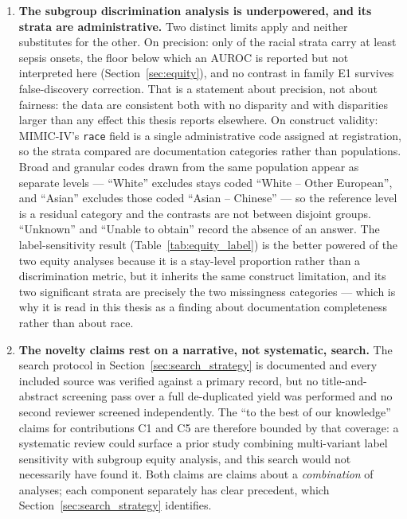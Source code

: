 \begin{enumerate}
    \item \textbf{The subgroup discrimination analysis is underpowered, and its
    strata are administrative.} Two distinct limits apply and neither
    substitutes for the other. On precision: only \pcNSubgroupsAboveFloor{} of
    the racial strata carry at least \pcMinSubgroupEvents{} sepsis onsets, the
    floor below which an AUROC is reported but not interpreted here
    (Section~\ref{sec:equity}), and no contrast in family E1 survives
    false-discovery correction. That is a statement about precision, not about
    fairness: the data are consistent both with no disparity and with
    disparities larger than any effect this thesis reports elsewhere. On
    construct validity: MIMIC-IV's \texttt{race} field is a single
    administrative code assigned at registration, so the strata compared are
    documentation categories rather than populations. Broad and granular codes
    drawn from the same population appear as separate levels --- ``White''
    excludes stays coded ``White -- Other European'', and ``Asian'' excludes
    those coded ``Asian -- Chinese'' --- so the reference level is a residual
    category and the contrasts are not between disjoint groups. ``Unknown'' and
    ``Unable to obtain'' record the absence of an answer. The
    label-sensitivity result (Table~\ref{tab:equity_label}) is the better
    powered of the two equity analyses because it is a stay-level proportion
    rather than a discrimination metric, but it inherits the same construct
    limitation, and its two significant strata are precisely the two
    missingness categories --- which is why it is read in this thesis as a
    finding about documentation completeness rather than about race.

    \item \textbf{The novelty claims rest on a narrative, not systematic,
    search.} The search protocol in Section~\ref{sec:search_strategy} is
    documented and every included source was verified against a primary record,
    but no title-and-abstract screening pass over a full de-duplicated yield was
    performed and no second reviewer screened independently. The ``to the best
    of our knowledge'' claims for contributions C1 and C5 are therefore bounded
    by that coverage: a systematic review could surface a prior study combining
    multi-variant label sensitivity with subgroup equity analysis, and this
    search would not necessarily have found it. Both claims are claims about a
    \emph{combination} of analyses; each component separately has clear
    precedent, which Section~\ref{sec:search_strategy} identifies.


\end{enumerate}
